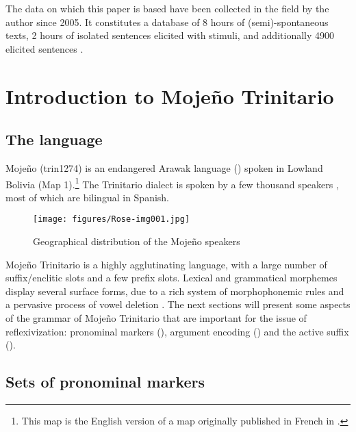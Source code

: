 \documentclass[output=paper]{langscibook}
\begin{document}
The data on which this paper is based have been collected in the field by the author since 2005. It constitutes a database of 8 hours of (semi)-spontaneous texts, 2 hours of isolated sentences elicited with stimuli, and additionally 4900 elicited sentences \citep{Rose2018}.


\section{Introduction to Mojeño Trinitario}
\label{sec:Rose:2}
\subsection{The language}
\label{sec:Rose:2.1}

Mojeño (trin1274) is an endangered Arawak language (\citealt{Gill1957, Rose2015Mojeno}) spoken in Lowland Bolivia (Map 1).\footnote{This map is the English version of a map originally published in French in \citet{Rose2010}.} The Trinitario dialect is spoken by a few thousand speakers \citep{CrevelsMuysken2009}, most of which are bilingual in Spanish.


\begin{figure}
\caption{\label{fig:Rose:1}Geographical distribution of the Mojeño speakers}
\texttt{[image: figures/Rose-img001.jpg]}
\end{figure}
 



Mojeño Trinitario is a highly agglutinating language, with a large number of suffix/enclitic slots and a few prefix slots. Lexical and grammatical morphemes display several surface forms, due to a rich system of morphophonemic rules and a pervasive process of vowel deletion \citep{Rose2019}. The next sections will present some aspects of the grammar of Mojeño Trinitario that are important for the issue of reflexivization: pronominal markers (), argument encoding () and the active suffix ().


\subsection{Sets of pronominal markers}
\label{sec:Rose:2.2}
\end{document}

